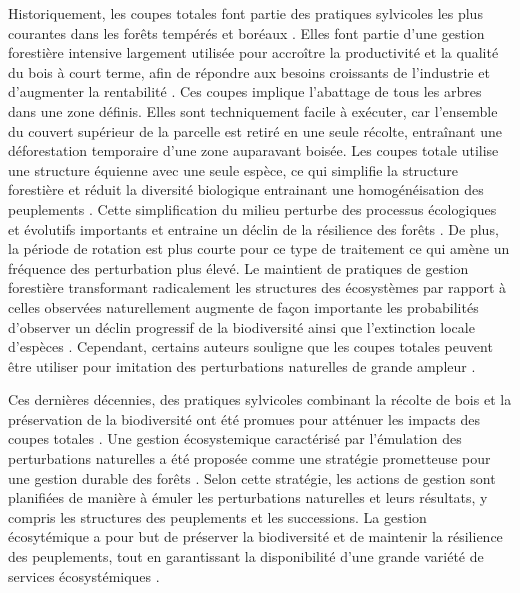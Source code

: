 Historiquement, les coupes totales font partie des pratiques sylvicoles les plus courantes dans les forêts tempérés et boréaux \citep{Fedrowitz2014Canretention,Chaudhary2016Impactforest}. 
Elles font partie d'une gestion forestière intensive largement utilisée pour accroître la productivité et la qualité du bois à court terme, afin de répondre aux besoins croissants de l'industrie et d'augmenter la rentabilité \citep{Irland2011TimberProductivitya}.
Ces coupes implique l'abattage de tous les arbres dans une zone définis.
Elles sont techniquement facile à exécuter, car l'ensemble du couvert supérieur de la parcelle est retiré en une seule récolte, entraînant une déforestation temporaire d'une zone auparavant boisée. 
Les coupes totale utilise une structure équienne avec une seule espèce, ce qui simplifie la structure forestière et réduit la diversité biologique entrainant une homogénéisation des peuplements \citep{Rosenvald2008whatwhen}. 
Cette simplification du milieu perturbe des processus écologiques et évolutifs importants et entraine un déclin de la résilience des forêts \citep{Holling2001UnderstandingComplexity}. 
De plus, la période de rotation est plus courte pour ce type de traitement ce qui amène un fréquence des perturbation plus élevé. 
Le maintient de pratiques de gestion forestière transformant radicalement les structures des écosystèmes par rapport à celles observées naturellement augmente de façon importante les probabilités d'observer un déclin progressif de la biodiversité ainsi que l'extinction locale d'espèces \citep{Hanski2000Extinctiondebt}.  
Cependant, certains auteurs souligne que les coupes totales peuvent être utiliser pour imitation des perturbations naturelles de grande ampleur \citep{Greenberg1995comparisonbird}. 

Ces dernières décennies, des pratiques sylvicoles combinant la récolte de bois et la préservation de la biodiversité ont été promues pour atténuer les impacts des coupes totales \citep{Gustafsson2012Retentionforestry}.
Une gestion écosystemique caractérisé par l'émulation des perturbations naturelles a été proposée comme une stratégie prometteuse pour une gestion durable des forêts \citep{Perry1998scientificbasis,Kuuluvainen2002Naturalvariabilitya}. 
Selon cette stratégie, les actions de gestion sont planifiées de manière à émuler les perturbations naturelles et leurs résultats, y compris les structures des peuplements et les successions. 
La gestion écosytémique a pour but de préserver la biodiversité et de maintenir la résilience des peuplements, tout en garantissant la disponibilité d'une grande variété de services écosystémiques \citep{Szaro1998emergenceecosystem,MacDicken2015Globalprogress}.

